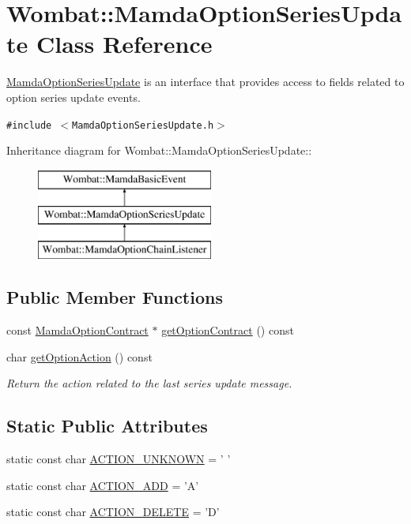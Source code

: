 \hypertarget{classWombat_1_1MamdaOptionSeriesUpdate}{
\section{Wombat::Mamda\-Option\-Series\-Update Class Reference}
\label{classWombat_1_1MamdaOptionSeriesUpdate}
}
\hyperlink{classWombat_1_1MamdaOptionSeriesUpdate}{Mamda\-Option\-Series\-Update} is an interface that provides access to fields related to option series update events.  


{\tt \#include $<$Mamda\-Option\-Series\-Update.h$>$}

Inheritance diagram for Wombat::Mamda\-Option\-Series\-Update::\begin{figure}[H]
\begin{center}
\leavevmode
\includegraphics[height=3cm]{classWombat_1_1MamdaOptionSeriesUpdate}
\end{center}
\end{figure}
\subsection*{Public Member Functions}
\begin{CompactItemize}
\item 
const \hyperlink{classWombat_1_1MamdaOptionContract}{Mamda\-Option\-Contract} $\ast$ \hyperlink{classWombat_1_1MamdaOptionSeriesUpdate_9aa226dbd2c289c60828ac1279d8777a}{get\-Option\-Contract} () const 
\item 
char \hyperlink{classWombat_1_1MamdaOptionSeriesUpdate_ae453033ff713e3a48251f3f747946db}{get\-Option\-Action} () const 
\begin{CompactList}\small\item\em Return the action related to the last series update message. \item\end{CompactList}\end{CompactItemize}
\subsection*{Static Public Attributes}
\begin{CompactItemize}
\item 
static const char \hyperlink{classWombat_1_1MamdaOptionSeriesUpdate_1e7b167a255ee1be49a99264edc2649b}{ACTION\_\-UNKNOWN} = ' '
\item 
static const char \hyperlink{classWombat_1_1MamdaOptionSeriesUpdate_7c20acc5ddfb0e866b99c7980897f4f0}{ACTION\_\-ADD} = 'A'
\item 
static const char \hyperlink{classWombat_1_1MamdaOptionSeriesUpdate_6ce2cf0215db3449708108d79846698f}{ACTION\_\-DELETE} = 'D'
\end{CompactItemize}


